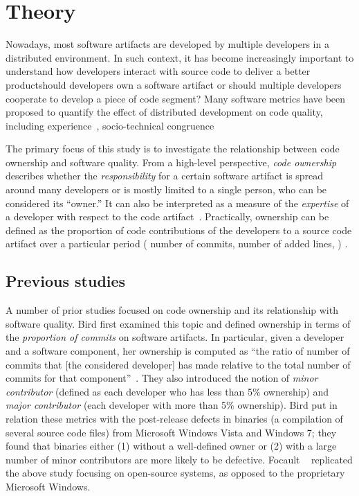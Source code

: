
\section{Theory}
\label{sec:prob}

Nowadays, most software artifacts are developed by multiple developers in a
distributed environment. In such context, it has become increasingly important
to understand how developers interact with source code to deliver a better
product\textemdash should developers own a software artifact or should multiple
developers cooperate to develop a piece of code segment? Many software metrics
have been proposed to quantify the effect of distributed development on code
quality, including experience~\cite{Rahman:blame}, socio-technical
congruence~\cite{sarma09ICSE} \etc 

The primary focus of this study is to investigate the relationship between code
ownership and software quality. From a high-level perspective, \emph{code
ownership} describes whether the \textit{responsibility} for a certain software
artifact is spread around many developers or is mostly limited to a single
person, who can be considered its ``owner.'' It can also be interpreted as a
measure of the \textit{expertise} of a developer with respect to the code
artifact~\cite{bird:original}.
%
Practically, ownership can be defined as the proportion of code contributions
of the developers to a source code artifact over a particular period (\eg
number of commits, number of added lines, \etc) \cite{Greiler:replication}.

\subsection{Previous studies}

A number of prior studies focused on code ownership and its relationship with
software quality.
Bird \etal first examined this topic and defined ownership in terms of the
\emph{proportion of commits} on software artifacts. In particular, given a
developer and a software component, her ownership is computed as ``the ratio of
number of commits that [the considered developer] has made relative to the
total number of commits for that component''~\cite{bird:original}. They also
introduced the notion of \emph{minor contributor} (defined as each developer
who has less than 5\% ownership) and \emph{major contributor} (each developer
with more than 5\% ownership). Bird \etal put in relation these metrics with
the post-release defects in binaries (a compilation of several source code
files) from Microsoft Windows Vista and Windows 7; they found that binaries
either (1) without a well-defined owner or (2) with a large number of minor
contributors are more likely to be defective.
Focault \etal~\cite{Foucault:oss} replicated the above study focusing on
open-source systems, as opposed to the proprietary Microsoft Windows.


